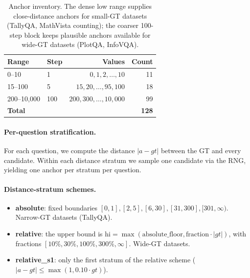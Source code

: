\documentclass[11pt]{article}
\begin{document}
\begin{table}[h]
  \centering
  \small
  \begin{tabular}{llrr}
    \toprule
    \textbf{Range} & \textbf{Step} & \textbf{Values} & \textbf{Count} \\
    \midrule
    0--10 & 1 & $0, 1, 2, \dots, 10$ & 11 \\
    15--100 & 5 & $15, 20, \dots, 95, 100$ & 18 \\
    200--10{,}000 & 100 & $200, 300, \dots, 10{,}000$ & 99 \\
    \midrule
    \multicolumn{3}{l}{\textbf{Total}} & \textbf{128} \\
    \bottomrule
  \end{tabular}
  \caption{Anchor inventory. The dense low range supplies close-distance anchors for small-GT datasets (TallyQA, MathVista counting); the coarser 100-step block keeps plausible anchors available for wide-GT datasets (PlotQA, InfoVQA).}
  \label{tab:anchor-inventory}
\end{table}

\paragraph{Per-question stratification.} For each question, we compute the distance $|a - gt|$ between the GT and every candidate. Within each distance stratum we sample one candidate via the RNG, yielding one anchor per stratum per question.

\paragraph{Distance-stratum schemes.}
\begin{itemize}
  \item \textbf{absolute}: fixed boundaries $[0, 1], [2, 5], [6, 30], [31, 300], [301, \infty)$. Narrow-GT datasets (TallyQA).
  \item \textbf{relative}: the upper bound is $\mathrm{hi} = \max(\text{absolute\_floor}, \text{fraction} \cdot |gt|)$, with fractions $[10\%, 30\%, 100\%, 300\%, \infty]$. Wide-GT datasets.
  \item \textbf{relative\_s1}: only the first stratum of the relative scheme ($|a - gt| \leq \max(1, 0.10 \cdot gt)$).
\end{itemize}
\end{document}

